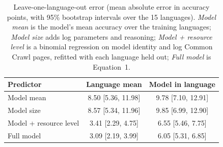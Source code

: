 \begin{table}[t]
\centering
\small
\begin{tabular}{lcc}
\hline
Predictor & Language mean & Model in language \\
\hline
Model mean & 8.50 [5.36, 11.98] & 9.78 [7.10, 12.91] \\
Model size & 8.57 [5.34, 11.96] & 9.85 [6.99, 12.90] \\
Model + resource level & 3.41 [2.29, 4.75] & 6.55 [5.46, 7.75] \\
Full model & 3.09 [2.19, 3.99] & 6.05 [5.31, 6.85] \\
\hline
\end{tabular}
\caption{Leave-one-language-out error (mean absolute error in accuracy points, with 95\% bootstrap intervals over the 15 languages). \emph{Model mean} is the model's mean accuracy over the training languages; \emph{Model size} adds log parameters and reasoning; \emph{Model + resource level} is a binomial regression on model identity and log Common Crawl pages, refitted with each language held out; \emph{Full model} is Equation~1.}
\label{tab:lolo-baselines}
\end{table}
